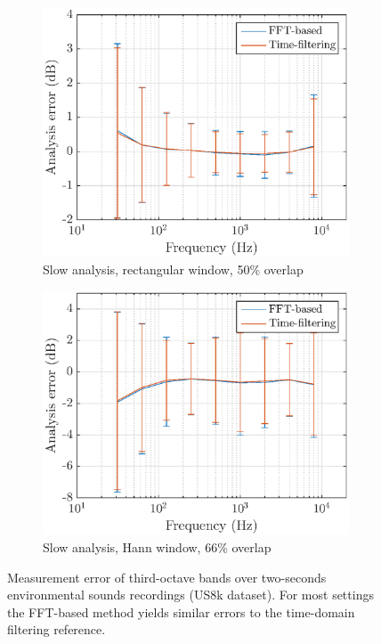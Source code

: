 \documentclass[sensors,article,submit,moreauthors,pdftex,10pt,a4paper]{mdpi}
\begin{document}
\begin{figure}[h!]
	\begin{subfigure}[h]{0.45\textwidth}
        \centering
        \includegraphics[width=1\textwidth]{figures/err_m_u_s_r.eps}
        \caption{Slow analysis, rectangular window, 50\% overlap}
    \end{subfigure}
    \hfill
    \begin{subfigure}[h]{0.45\textwidth}
        \centering
        \includegraphics[width=1\textwidth]{figures/err_m_u_s_h.eps}
        \caption{Slow analysis, Hann window, 66\% overlap}
    \end{subfigure}
    \caption{Measurement error of third-octave bands over two-seconds environmental sounds recordings (US8k dataset). For most settings the FFT-based method yields similar errors to the time-domain filtering reference. \label{fig:errormu}}
\end{figure}
\end{document}
